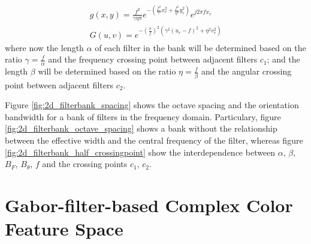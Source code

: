 \documentclass[journal]{IEEEtran}
\begin{document}
\begin{equation}\label{eq:gabor_function_2d_spacefreq_bank}
    \begin{gathered}
         g(x,y) =  \frac{f^2}{\gamma \eta \pi} e ^{-\left(\frac{f^2}{\gamma^2} x_r^2 + \frac{f^2}{\eta^2} y_r^2\right)} e ^{j 2 \pi f x_r } \\
         G(u,v) =  e ^{-\left(\frac{\pi}{f}\right)^2\left( \gamma^2 (u_r-f)^2 + \eta^2 v_r^2\right)}
     \end{gathered}
\end{equation}
where now the length $\alpha$ of each filter in the bank will be determined based on the ratio $\gamma = \frac{f}{\alpha}$ and the frequency crossing point between adjacent filters $c_1$; and the length $\beta$ will be determined based on the ratio $\eta = \frac{f}{\beta}$ and the angular crossing point between adjacent filters $c_2$.

Figure \ref{fig:2d_filterbank_spacing} shows the octave spacing and the orientation bandwidth for a bank of filters in the frequency domain. Particulary, figure \ref{fig:2d_filterbank_octave_spacing} shows a bank without the relationship between the effective width and the central frequency of the filter, whereas figure \ref{fig:2d_filterbank_half_crossingpoint} show the interdependence between $\alpha$, $\beta$, $B_F$, $B_{\theta}$, $f$ and the crossing points $c_1$, $c_2$.

%	    


\section{Gabor-filter-based Complex Color Feature Space}
\end{document}
